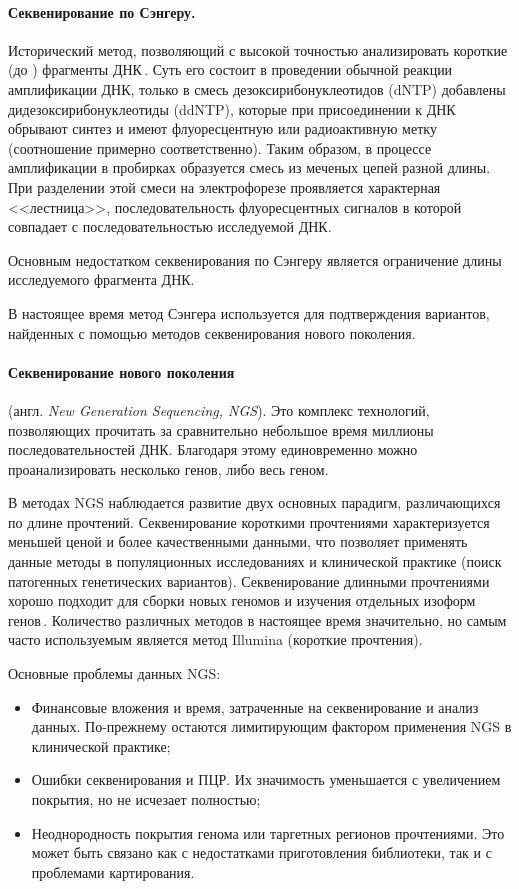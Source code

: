 \documentclass[a4paper,14pt]{extarticle}
\newcommand{\ecitep}[1]{\textenglish{\citep{#1}}}
\newcommand{\engterm}[1]{англ. \textenglish{\textit{#1}}}
\begin{document}
\paragraph{Секвенирование по Сэнгеру.}
Исторический метод, позволяющий с высокой точностью анализировать короткие (до ) фрагменты ДНК\,\ecitep{Sanger_1977}.
Суть его состоит в проведении обычной реакции амплификации ДНК, только в смесь дезоксирибонуклеотидов (dNTP) добавлены дидезоксирибонуклеотиды (ddNTP), которые при присоединении к ДНК обрывают синтез и имеют флуоресцентную или радиоактивную метку (соотношение примерно  соответственно).
Таким образом, в процессе амплификации в пробирках образуется смесь из меченых цепей разной длины.
При разделении этой смеси на электрофорезе проявляется характерная <<лестница>>, последовательность флуоресцентных сигналов в которой совпадает с последовательностью исследуемой ДНК.

Основным недостатком секвенирования по Сэнгеру является ограничение длины исследуемого фрагмента ДНК.

В настоящее время метод Сэнгера используется для подтверждения вариантов, найденных с помощью методов секвенирования нового поколения.

\paragraph{Секвенирование нового поколения} (\engterm{New Generation Sequencing, NGS}).
Это комплекс технологий, позволяющих прочитать за сравнительно небольшое время миллионы последовательностей ДНК.
Благодаря этому единовременно можно проанализировать несколько генов, либо весь геном.

В методах NGS наблюдается развитие двух основных парадигм, различающихся по длине прочтений.
Секвенирование короткими прочтениями характеризуется меньшей ценой и более качественными данными, что позволяет применять данные методы в популяционных исследованиях и клинической практике (поиск патогенных генетических вариантов).
Секвенирование длинными прочтениями хорошо подходит для сборки новых геномов и изучения отдельных изоформ генов\,\ecitep{Goodwin_2016}.
Количество различных методов в настоящее время значительно, но самым часто используемым является метод Illumina (короткие прочтения).

Основные проблемы данных NGS:

\begin{itemize}
	\item Финансовые вложения и время, затраченные на секвенирование и анализ данных.
	 По-прежнему остаются лимитирующим фактором применения NGS в клинической практике;
	\item Ошибки секвенирования и ПЦР.
	 Их значимость уменьшается с увеличением покрытия, но не исчезает полностью;
	\item Неоднородность покрытия генома или таргетных регионов прочтениями.
	 Это может быть связано как с недостатками приготовления библиотеки, так и с проблемами картирования.
\end{itemize}
\end{document}
